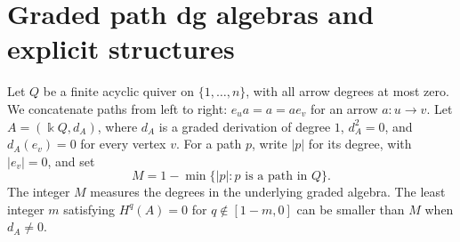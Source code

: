 \documentclass[11pt,a4paper]{article}
\theoremstyle{plain}
\theoremstyle{definition}
\numberwithin{equation}{section}
\begin{document}
\section{Graded path dg algebras and explicit structures}
\label{good:paths}

Let $Q$ be a finite acyclic quiver on $\{1,\ldots,n\}$, with all
arrow degrees at most zero. We concatenate paths from left to right:
$e_ua=a=ae_v$ for an arrow $a:u\to v$.
Let $A=(\Bbbk Q,d_A)$, where $d_A$ is a graded derivation of degree
$1$, $d_A^2=0$, and $d_A(e_v)=0$ for every vertex $v$.
For a path $p$, write $|p|$ for its degree, with $|e_v|=0$, and set
\begin{equation}\label{good:path-width}
 M=1-\min\{|p|:p\text{ is a path in }Q\}.
\end{equation}
The integer $M$ measures the degrees in the underlying graded algebra.
The least integer $m$ satisfying $H^q(A)=0$ for $q\notin[1-m,0]$
can be smaller than $M$ when $d_A\neq0$.
\end{document}
